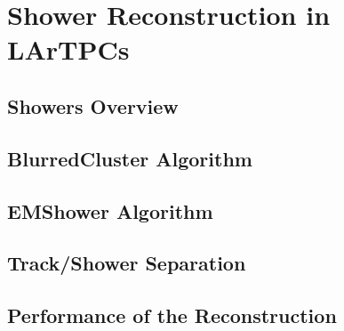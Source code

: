 \section{Shower Reconstruction in LArTPCs}\label{sec:ShowerReconstruction}

\subsection{Showers Overview}\label{sec:ShowersOverview}

\subsection{BlurredCluster Algorithm}\label{sec:BlurredCluster}

\subsection{EMShower Algorithm}\label{sec:EMShower}

\subsection{Track/Shower Separation}\label{sec:TrackShowerSeparation}

\subsection{Performance of the Reconstruction}\label{sec:ReconstructionPerformance}
